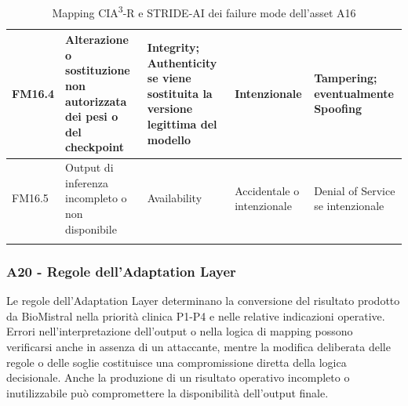 {\begin{xltabular}{\textwidth}{
    >{\raggedright\arraybackslash}p{1.35cm}
    X
    >{\raggedright\arraybackslash}p{3.5cm}
    >{\raggedright\arraybackslash}p{2.7cm}
    >{\raggedright\arraybackslash}p{2.4cm}
}
FM16.4 &

Alterazione o sostituzione non autorizzata dei pesi o del checkpoint &

Integrity; Authenticity se viene sostituita la versione legittima del modello &

Intenzionale &

Tampering; eventualmente Spoofing \\

\midrule


FM16.5 &

Output di inferenza incompleto o non disponibile &

Availability &

Accidentale o intenzionale &

Denial of Service se intenzionale \\

\bottomrule

\caption{Mapping CIA\textsuperscript{3}-R e STRIDE-AI dei failure mode dell'asset A16}

\label{tab:a16-stride}\\

\end{xltabular}
}

\subsubsection{A20 - Regole dell'Adaptation Layer}
Le regole dell'Adaptation Layer determinano la conversione del risultato prodotto da BioMistral nella priorità clinica P1-P4 e nelle relative indicazioni operative. Errori nell'interpretazione dell'output o nella logica di mapping possono verificarsi anche in assenza di un attaccante, mentre la modifica deliberata delle regole o delle soglie costituisce una compromissione diretta della logica decisionale. Anche la produzione di un risultato operativo incompleto o inutilizzabile può compromettere la disponibilità dell'output finale.





